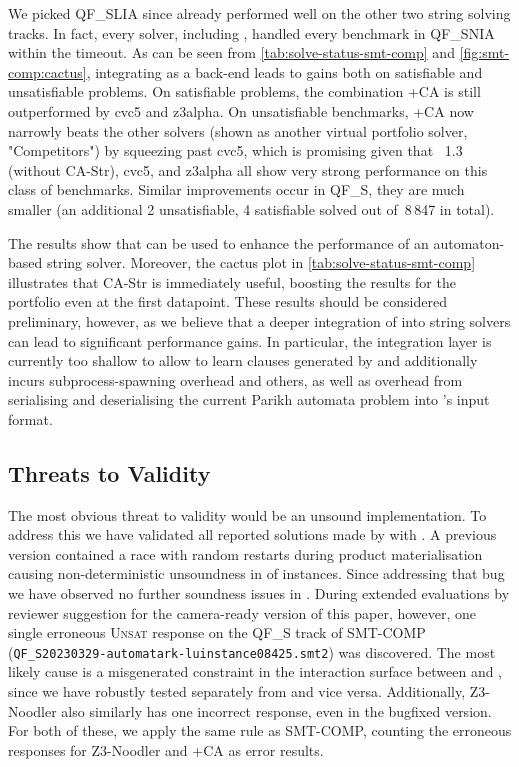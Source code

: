 We picked QF\_SLIA since
\Ostrich{} already performed well on the other two string solving tracks. In fact,
every solver, including \Ostrich{}, handled every benchmark in QF\_SNIA within the timeout.
%
As can be seen from \cref{tab:solve-status-smt-comp} and \cref{fig:smt-comp:cactus},
integrating \Catra{} as a back-end
leads to gains both on satisfiable and unsatisfiable problems. On
satisfiable problems, the combination \Ostrich+CA is still
outperformed by cvc5 and z3alpha. On unsatisfiable benchmarks,
\Ostrich+CA now narrowly beats the other solvers 
(shown as another virtual portfolio solver, "Competitors") by squeezing past cvc5,
which is promising given that \Ostrich{}~1.3 (without CA-Str), cvc5, and z3alpha all show very strong
performance on this class of benchmarks. Similar improvements
occur in QF\_S, they are much smaller (an additional 2 unsatisfiable, 4 satisfiable 
solved out of~8\,847 in total).

The results show that \Calculus{} can be used to enhance the performance of an
automaton-based string solver. Moreover, the cactus plot in \cref{tab:solve-status-smt-comp} 
illustrates that
CA-Str is immediately useful, boosting the results for the \Ostrich{} portfolio
even at the first datapoint. These results should be considered preliminary,
however, as we believe that a deeper integration of \Catra{} into string solvers
can lead to significant performance gains. In particular, the integration layer 
is currently too shallow to allow \Ostrich{} to learn clauses generated by \Catra{}
and additionally incurs subprocess-spawning overhead and others, as well as overhead
from serialising and deserialising the current Parikh automata problem into \Catra{}'s
input format.

\subsection{Threats to Validity}

The most obvious threat to validity would be an unsound implementation. To
address this we have validated all reported solutions made by \Calculus{} with
\Nuxmv{}. A previous version contained a race with random restarts during
product materialisation causing non-deterministic unsoundness in 
of instances. Since addressing that bug we have observed no further soundness
issues in \Catra{}. During extended evaluations by reviewer suggestion for the 
camera-ready version of this paper, however, one single erroneous \textsc{Unsat} 
response on the QF\_S track of 
SMT-COMP (\texttt{QF\_S\/20230329-automatark-lu\/instance08425.smt2}) was discovered.
The most likely cause is a misgenerated constraint in the interaction surface between \Ostrich{}
and \Catra{}, since we have robustly tested 
\Catra{} separately from \Ostrich{} and vice versa. Additionally, Z3-Noodler
also similarly has one incorrect response, even in the bugfixed version. For both of
these, we apply the same rule as SMT-COMP, counting the erroneous responses for Z3-Noodler
and \Ostrich{}+CA as error results.

